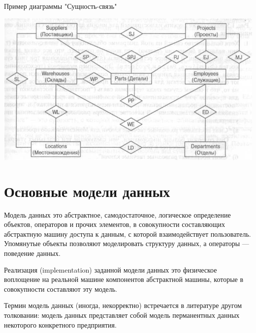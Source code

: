 \documentclass{beamer}
\begin{document}
\begin{frame}
\begin{block}{Пример диаграммы "Сущность-связь"}
\begin{center}
\includegraphics[scale=0.5]{images/shema-02.png}
\end{center}
\end{block}
\end{frame}

\section{Основные модели данных}

\begin{frame}
\begin{block}{Модель данных}
это абстрактное, самодостаточное, логическое определение объектов, операторов и прочих элементов, в совокупности составляющих абстрактную машину доступа к данным, с которой взаимодействует пользователь. Упомянутые объекты позволяют моделировать структуру данных, а операторы — поведение данных.
\end{block}
\begin{block}{Реализация (implementation) заданной модели данных}
это физическое воплощение на реальной машине компонентов абстрактной машины, которые в совокупности составляют эту модель.
\end{block}
Термин модель данных (иногда, некорректно) встречается в литературе другом толковании: модель данных представляет собой модель перманентных данных некоторого конкретного предприятия.
\end{frame}
\end{document}
